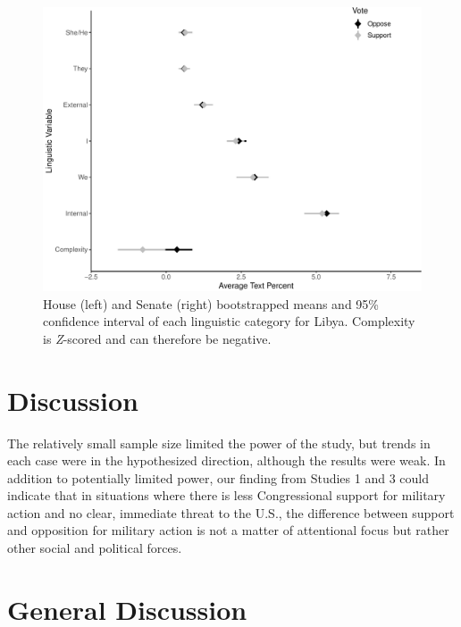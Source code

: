 \documentclass[english,,man]{apa6}
\begin{document}
\begin{figure}
\centering
\includegraphics{Language-of-War-Markdown_KJ2_files/figure-latex/Lpic-1.pdf}
\caption{\label{fig:Lpic}House (left) and Senate (right) bootstrapped means and 95\% confidence interval of each linguistic category for Libya. Complexity is \emph{Z}-scored and can therefore be negative.}
\end{figure}

\hypertarget{discussion-2}{%
\section{Discussion}\label{discussion-2}}

The relatively small sample size limited the power of the study, but trends in each case were in the hypothesized direction, although the results were weak. In addition to potentially limited power, our finding from Studies 1 and 3 could indicate that in situations where there is less Congressional support for military action and no clear, immediate threat to the U.S., the difference between support and opposition for military action is not a matter of attentional focus but rather other social and political forces.

\hypertarget{general-discussion}{%
\section{General Discussion}\label{general-discussion}}
\end{document}
